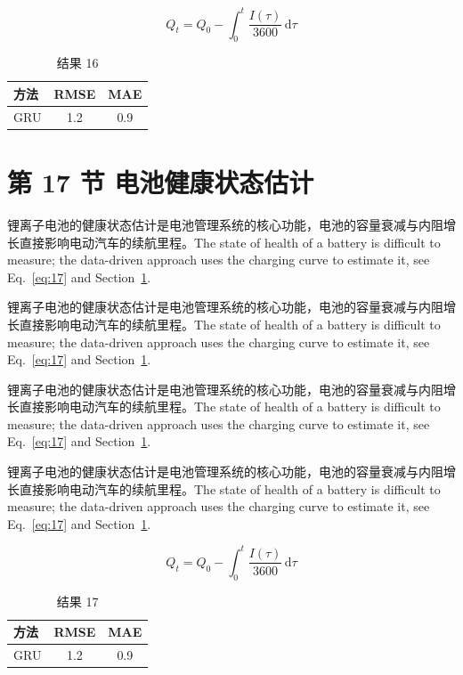 \documentclass[UTF8,fontset=mac]{ctexart}
\begin{document}
\begin{equation}\label{eq:16}
  Q_t = Q_0 - \int_0^t \frac{I(\tau)}{3600}\,\mathrm{d}\tau
\end{equation}
\begin{table}[h]\centering\begin{tabular}{lcc}\toprule 方法 & RMSE & MAE\\\midrule GRU & 1.2 & 0.9\\\bottomrule\end{tabular}\caption{结果 16}\end{table}

\section{第 17 节 电池健康状态估计}\label{sec:17}
锂离子电池的健康状态估计是电池管理系统的核心功能，电池的容量衰减与内阻增长直接影响电动汽车的续航里程\cite{a2020}。The state of health of a battery is difficult to measure; the data-driven approach uses the charging curve to estimate it, see Eq.~\eqref{eq:17} and Section~\ref{sec:17}.

锂离子电池的健康状态估计是电池管理系统的核心功能，电池的容量衰减与内阻增长直接影响电动汽车的续航里程\cite{a2020}。The state of health of a battery is difficult to measure; the data-driven approach uses the charging curve to estimate it, see Eq.~\eqref{eq:17} and Section~\ref{sec:17}.

锂离子电池的健康状态估计是电池管理系统的核心功能，电池的容量衰减与内阻增长直接影响电动汽车的续航里程\cite{a2020}。The state of health of a battery is difficult to measure; the data-driven approach uses the charging curve to estimate it, see Eq.~\eqref{eq:17} and Section~\ref{sec:17}.

锂离子电池的健康状态估计是电池管理系统的核心功能，电池的容量衰减与内阻增长直接影响电动汽车的续航里程\cite{a2020}。The state of health of a battery is difficult to measure; the data-driven approach uses the charging curve to estimate it, see Eq.~\eqref{eq:17} and Section~\ref{sec:17}.

\begin{equation}\label{eq:17}
  Q_t = Q_0 - \int_0^t \frac{I(\tau)}{3600}\,\mathrm{d}\tau
\end{equation}
\begin{table}[h]\centering\begin{tabular}{lcc}\toprule 方法 & RMSE & MAE\\\midrule GRU & 1.2 & 0.9\\\bottomrule\end{tabular}\caption{结果 17}\end{table}
\end{document}
